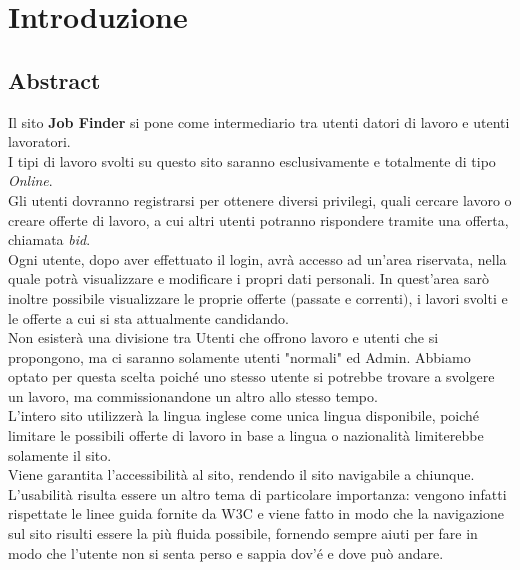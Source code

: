 \section{Introduzione}
	\subsection{Abstract}
	Il sito \textbf{Job Finder} si pone come intermediario tra utenti datori di lavoro e utenti lavoratori.\\
  I tipi di lavoro svolti su questo sito saranno esclusivamente e totalmente di tipo \textit{Online}. \\
	Gli utenti dovranno registrarsi per ottenere diversi privilegi, quali cercare lavoro o creare offerte di lavoro, a cui altri utenti potranno rispondere tramite una offerta, 
  chiamata \textit{bid}.\\
  Ogni utente, dopo aver effettuato il login, avrà accesso ad un'area riservata, nella quale potrà visualizzare e modificare i propri dati personali. In quest'area sarò inoltre 
  possibile visualizzare le proprie offerte $($passate e correnti$)$, i lavori svolti e le offerte a cui si sta attualmente candidando.\\
  Non esisterà una divisione tra Utenti che offrono lavoro e utenti che si propongono, ma ci saranno solamente utenti "normali" ed Admin. Abbiamo optato per questa scelta poiché 
  uno stesso utente si potrebbe trovare a svolgere un lavoro, ma commissionandone un altro allo stesso tempo.\\
  L'intero sito utilizzerà la lingua inglese come unica lingua disponibile, poiché limitare le possibili offerte di lavoro in base a lingua o nazionalità limiterebbe solamente 
  il sito.\\
  Viene garantita l’accessibilità al sito, rendendo il sito navigabile a chiunque.\\
  L’usabilità risulta essere un altro tema di particolare importanza: vengono infatti rispettate le linee guida fornite da W3C e viene fatto in modo che la navigazione sul sito
  risulti essere la più fluida possibile, fornendo sempre aiuti per fare in modo che l’utente non si senta perso e sappia dov'é e dove può andare.
	